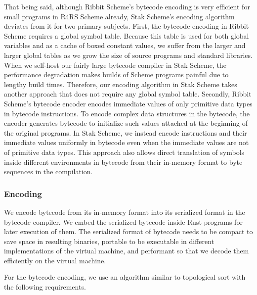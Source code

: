 \documentclass[sigplan, anonymous, review]{acmart}
\begin{document}
That being said, although Ribbit Scheme's bytecode encoding is very efficient
for small programs in R4RS Scheme already, Stak Scheme's encoding algorithm
deviates from it for two primary subjects.
First, the bytecode encoding in Ribbit Scheme requires a global symbol table.
Because this table is used for both global variables and as a cache of
boxed constant values, we suffer from the larger and larger global tables
as we grow the size of source programs and standard libraries.
When we self-host our fairly large bytecode compiler in Stak Scheme,
the performance degradation makes builds of Scheme programs painful due
to lengthy build times.
Therefore, our encoding algorithm in Stak Scheme takes another approach that
does not require any global symbol table.
Secondly, Ribbit Scheme's bytecode encoder encodes
immediate values of only primitive data types in bytecode instructions.
To encode complex data structures in the bytecode, the encoder
generates bytecode to initialize such values attached at the
beginning of the original programs.
In Stak Scheme, we instead encode instructions and their immediate
values uniformly in bytecode even when the immediate values are not
of primitive data types.
This approach also allows direct translation of symbols inside
different environments in bytecode from their in-memory format to
byte sequences in the compilation.

\subsubsection{Encoding} \label{encoding}

We encode bytecode from its in-memory format into its serialized format in the
bytecode compiler.
We embed the serialized bytecode inside Rust programs for later
execution of them.
The serialized format of bytecode needs to be compact to save space in
resulting binaries, portable to be executable in different
implementations of the virtual machine, and performant so that we
decode them efficiently on the virtual machine.

For the bytecode encoding, we use an algorithm similar to topological
sort \cite{topologicalsort} with the following requirements.
\end{document}
